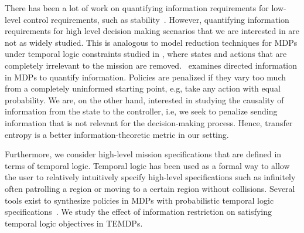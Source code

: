 There has been a lot of work on quantifying information requirements for low-level control requirements, such as stability~\cite{Nair07}. However, quantifying information requirements for high level decision making scenarios that we are interested in are not as widely studied. This is analogous to model reduction techniques for MDPs under temporal logic constraints studied in \cite{Bharadwaj17,brazdil2014verification,ciesinski2008reduction}, where states and actions that are completely irrelevant to the mission are removed.~\cite{Tishby2011} examines directed information in MDPs to quantify information. Policies are penalized if they vary too much from a completely uninformed starting point, e.g, take any action with equal probability. We are, on the other hand, interested in studying the causality of information from the state to the controller, i.e, we seek to penalize sending information that is not relevant for the decision-making process. Hence, transfer entropy is a better information-theoretic metric in our setting. 

%



%


Furthermore, we consider high-level mission specifications that are defined in terms of temporal logic. Temporal logic has been used as a formal way to allow the user to relatively intuitively specify high-level specifications such as infinitely often patrolling a region or moving to a certain region without collisions. %
Several tools exist to synthesize policies in MDPs with probabilistic temporal logic specifications~\cite{Svoreňová13,Fu15}. We study the effect of information restriction on satisfying temporal logic objectives in TEMDPs. 

